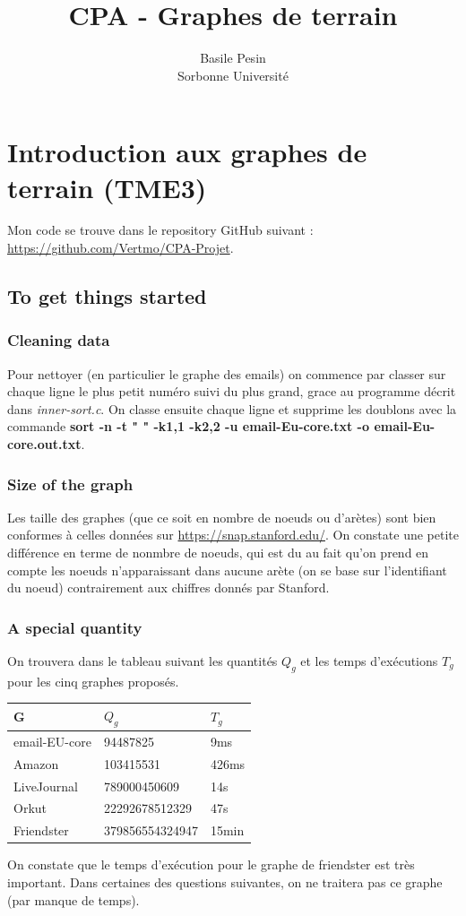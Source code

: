 \documentclass{report}
\title{CPA - Graphes de terrain}
\author{Basile Pesin\\Sorbonne Université}
\begin{document}
\maketitle

\chapter{Introduction aux graphes de terrain (TME3)}

\noindent Mon code se trouve dans le repository GitHub suivant : \url{https://github.com/Vertmo/CPA-Projet}.

\section{To get things started}

\subsection*{Cleaning data}
Pour nettoyer (en particulier le graphe des emails) on commence par classer sur chaque ligne le plus petit numéro suivi du plus grand, grace au programme décrit dans \textit{inner-sort.c}. On classe ensuite chaque ligne et supprime les doublons avec la commande \textbf{sort -n -t " " -k1,1 -k2,2 -u email-Eu-core.txt -o email-Eu-core.out.txt}.

\subsection*{Size of the graph}
Les taille des graphes (que ce soit en nombre de noeuds ou d'arètes) sont bien conformes à celles données sur \url{https://snap.stanford.edu/}. On constate une petite différence en terme de nonmbre de noeuds, qui est du au fait qu'on prend en compte les noeuds n'apparaissant dans aucune arète (on se base sur l'identifiant du noeud) contrairement aux chiffres donnés par Stanford.

\subsection*{A special quantity}
On trouvera dans le tableau suivant les quantités $Q_g$ et les temps d'exécutions $T_g$ pour les cinq graphes proposés.

\begin{center}
  \begin{tabular}{|l|l|l|}
    \hline
    G & $Q_g$ & $T_g$ \\
    \hline
    email-EU-core & 94487825 & 9ms\\
    Amazon & 103415531 & 426ms \\
    LiveJournal & 789000450609 & 14s \\
    Orkut & 22292678512329 & 47s \\
    Friendster & 379856554324947 & 15min \\
    \hline
  \end{tabular}
\end{center}
On constate que le temps d'exécution pour le graphe de friendster est très important. Dans certaines des questions suivantes, on ne traitera pas ce graphe (par manque de temps).
\end{document}
